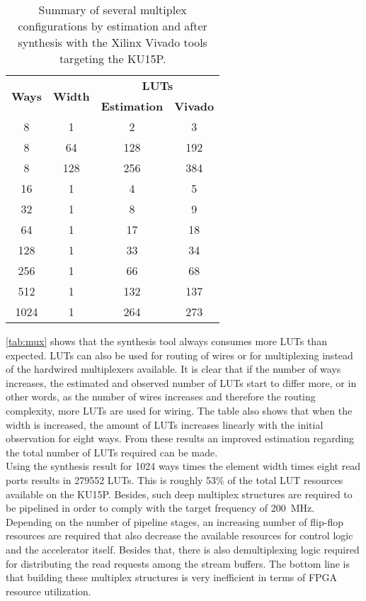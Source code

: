 \begin{table}[H]
  \centering
  \caption{Summary of several multiplex configurations by estimation and after synthesis with the Xilinx Vivado tools targeting the KU15P.}
  \label{tab:mux}
  \begin{tabular}{ c | c || c | c }
    \multirow{2}{*}{\textbf{Ways}} & \multirow{2}{*}{\textbf{Width}} & \multicolumn{2}{c}{\textbf{LUTs}} \\ \cline{3-4}
                  &     & \textbf{Estimation} & \textbf{Vivado} \\ \hline \hline
    8             & 1   & 2                   & 3 \\
    8             & 64  & 128                 & 192 \\
    8             & 128 & 256                 & 384 \\
    16            & 1   & 4                   & 5 \\
    32            & 1   & 8                   & 9 \\
    64            & 1   & 17                  & 18 \\ %
    128           & 1   & 33                  & 34 \\
    256           & 1   & 66                  & 68 \\
    512           & 1   & 132                 & 137 \\
    1024          & 1   & 264                 & 273 \\
  \end{tabular}
\end{table}

\autoref{tab:mux} shows that the synthesis tool always consumes more LUTs than expected. LUTs can also be used for routing of wires or for multiplexing instead of the hardwired multiplexers available. It is clear that if the number of ways increases, the estimated and observed number of LUTs start to differ more, or in other words, as the number of wires increases and therefore the routing complexity, more LUTs are used for wiring. The table also shows that when the width is increased, the amount of LUTs increases linearly with the initial observation for eight ways. From these results an improved estimation regarding the total number of LUTs required can be made.\\
Using the synthesis result for 1024 ways times the element width times eight read ports results in 279552 LUTs. This is roughly 53\% of the total LUT resources available on the KU15P. Besides, such deep multiplex structures are required to be pipelined in order to comply with the target frequency of \SI{200}{\mega\hertz}. Depending on the number of pipeline stages, an increasing number of flip-flop resources are required that also decrease the available resources for control logic and the accelerator itself. Besides that, there is also demultiplexing logic required for distributing the read requests among the stream buffers. The bottom line is that building these multiplex structures is very inefficient in terms of FPGA resource utilization.

